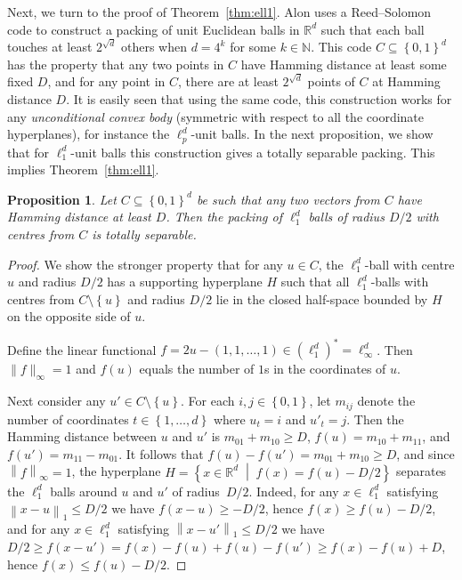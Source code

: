 \documentclass[a4paper,12pt]{article}
\theoremstyle{plain}
\newtheorem{proposition}[theorem]{Proposition}
\theoremstyle{definition}
\newcommand{\setbuilder}[2]{\left\{#1\;\middle|\;#2\right\}}
\newcommand{\set}[1]{\left\{#1\right\}}
\newcommand{\numbersystem}[1]{\mathbb{#1}}
\newcommand{\bN}{\numbersystem{N}}
\newcommand{\bR}{\numbersystem{R}}
\newcommand{\norm}[2][]{\left\lVert#2\right\rVert_{#1}}
\begin{document}
Next, we turn to the proof of Theorem~\ref{thm:ell1}.
Alon \cite{Alon97} uses a Reed--Solomon code to construct a packing of unit 
Euclidean balls in $\bR^d$ such that each ball touches at least $2^{\sqrt{d}}$ 
others when $d=4^k$ for some $k\in\bN$. 
This code $C\subseteq\set{0,1}^d$ has the property that any two points in $C$ have 
Hamming distance at least some fixed $D$, and for any point in $C$, there are at least $2^{\sqrt{d}}$ points of $C$ at Hamming distance $D$.
It is easily seen that using the same code, this 
construction works for any \emph{unconditional convex body} (symmetric with respect to all the coordinate hyperplanes), for instance the 
$\ell_p^d$-unit balls.
In the next proposition, we show that for $\ell_1^d$-unit balls this construction gives a totally 
separable packing. This implies Theorem~\ref{thm:ell1}.

\begin{proposition}\label{prop:ellonepacking}
Let $C\subseteq\set{0,1}^d$ be such that any two vectors from $C$ have 
Hamming distance at least $D$.
Then the packing of $\ell_1^d$ balls of radius $D/2$ with centres from $C$ is 
totally separable.
\end{proposition}
\begin{proof}
We show the stronger property that for any $u\in C$, the $\ell_1^d$-ball with 
centre $u$ and radius $D/2$ has a supporting hyperplane $H$ such that all 
$\ell_1^d$-balls with centres from $C\setminus\set{u}$ and radius $D/2$ lie in 
the closed half-space bounded by $H$ on the opposite side of $u$.

Define the linear functional $f = 2u - 
(1,1,\dots,1)\in(\ell_1^d)^*=\ell_\infty^d$.
Then $\|f\|_\infty=1$ and $f(u)$ equals the number of $1$s in the coordinates of $u$.

Next consider any $u'\in C\setminus\set{u}$.
For each $i,j\in\set{0,1}$, let $m_{ij}$ denote the number of coordinates 
$t\in\set{1,\dots,d}$ where $u_t=i$ and $u'_t=j$.
Then 
the Hamming distance between $u$ and $u'$ is $m_{01}+m_{10}\geq D$, 
$f(u)=m_{10}+m_{11}$, and $f(u')= m_{11}-m_{01}$.
It follows that $f(u)-f(u') = m_{01}+m_{10}\geq D$, and since $\norm[\infty]{f}=1$, 
the hyperplane $H=\setbuilder{x\in\bR^d}{f(x)=f(u)-D/2}$ separates the $\ell_1^d$ balls around $u$ and $u'$ of 
radius~$D/2$.
Indeed, for any $x\in\ell_1^d$ satisfying $\norm[1]{x-u}\leq D/2$
we have $f(x-u)\geq -D/2$, hence $f(x)\geq f(u)-D/2$,
and for any $x\in\ell_1^d$ satisfying $\norm[1]{x-u'}\leq D/2$
we have $D/2\geq f(x-u')=f(x)-f(u)+f(u)-f(u')\geq f(x)-f(u)+D$, hence $f(x)\leq f(u)-D/2$.
\end{proof}
\end{document}
